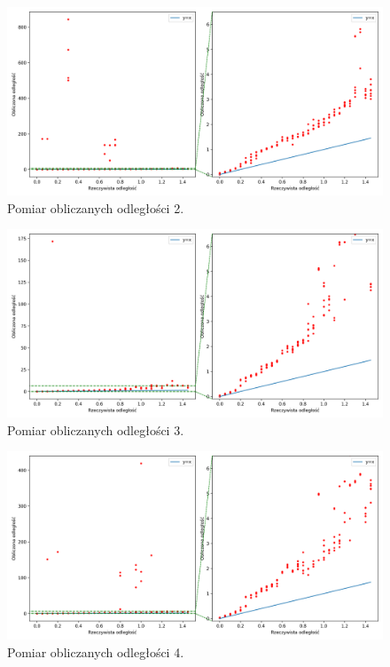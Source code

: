 \begin{figure}[h]
\centering
    \includegraphics[width=\textwidth]{pics/mic_sync_dist/dists_long_1.png}
\caption{Pomiar obliczanych odległości 2.}
\label{pic:slope_test_1}
\end{figure}

\begin{figure}[h]
\centering
    \includegraphics[width=\textwidth]{pics/mic_sync_dist/dists_long_2.png}
\caption{Pomiar obliczanych odległości 3.}
\label{pic:slope_test_2}
\end{figure}

\begin{figure}[h]
\centering
    \includegraphics[width=\textwidth]{pics/mic_sync_dist/dists_long_3.png}
\caption{Pomiar obliczanych odległości 4.}
\label{pic:slope_test_3}
\end{figure}

